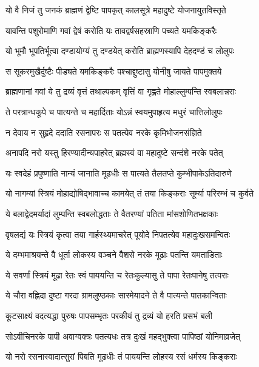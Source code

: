 \twolineshloka
{यो वै निजं तु जनकं ब्राह्मणं द्वेष्टि पापकृत्}
{कालसूत्रे महादुष्टे योजनायुतविस्तृते}%

\twolineshloka
{यावन्ति पशुरोमाणि गवां द्वेषं करोति यः}
{तावद्वर्षसहस्राणि पच्यते यमकिङ्करैः}%

\twolineshloka
{यो भूमौ भूपतिर्भूत्वा दण्डायोग्यं तु दण्डयेत्}
{करोति ब्राह्मणस्यापि देहदण्डं च लोलुपः}%

\twolineshloka
{स सूकरमुखैर्दुष्टैः पीड्यते यमकिङ्करैः}
{पश्चाद्दुष्टासु योनीषु जायते पापमुक्तये}%

\twolineshloka
{ब्राह्मणानां गवां ये तु द्रव्यं वृत्तं तथाल्पकम्}
{वृत्तिं वा गृह्णते मोहाल्लुम्पन्ति स्वबलान्नराः}%

\twolineshloka
{ते परत्रान्धकूपे च पात्यन्ते च महार्दिताः}
{योऽन्नं स्वयमुपाहृत्य मधुरं चात्तिलोलुपः}%

\twolineshloka
{न देवाय न सुहृदे ददाति रसनापरः}
{स पतत्येव नरके कृमिभोजनसंज्ञिते}%

\twolineshloka
{अनापदि नरो यस्तु हिरण्यादीन्यपाहरेत्}
{ब्रह्मस्वं वा महादुष्टे सन्दंशे नरके पतेत्}%

\twolineshloka
{यः स्वदेहं प्रपुष्णाति नान्यं जानाति मूढधीः}
{स पात्यते तैलतप्ते कुम्भीपाकेऽतिदारुणे}%

\twolineshloka
{यो नागम्यां स्त्रियं मोहाद्योषिद्भावाच्च कामयेत्}
{तं तया किङ्कराः सूर्म्या परिरम्भं च कुर्वते}%

\twolineshloka
{ये बलाद्वेदमर्यादां लुम्पन्ति स्वबलोद्धताः}
{ते वैतरण्यां पतिता मांसशोणितभक्षकाः}%

\twolineshloka
{वृषलद्यं यः स्त्रियं कृत्वा तया गार्हस्थ्यमाचरेत्}
{पूयोदे निपतत्येव महादुःखसमन्वितः}%

\twolineshloka
{ये दम्भमाश्रयन्ते वै धूर्ता लोकस्य वञ्चने}
{वैशसे नरके मूढाः पतन्ति यमताडिताः}%

\twolineshloka
{ये सवर्णां स्त्रियं मूढा रेतः स्वं पाययन्ति च}
{रेतःकुल्यासु ते पापा रेतःपानेषु तत्पराः}%

\twolineshloka
{ये चौरा वह्निदा दुष्टा गरदा ग्रामलुण्ठकाः}
{सारमेयादने ते वै पात्यन्ते पातकान्विताः}%

\twolineshloka
{कूटसाक्ष्यं वदत्यद्धा पुरुषः पापसम्भृतः}
{परकीयं तु द्रव्यं यो हरति प्रसभं बली}%

\twolineshloka
{सोऽवीचिनरके पापी अवाग्वक्त्रः पतत्यधः}
{तत्र दुःखं महद्भुक्त्वा पापिष्ठां योनिमाव्रजेत्}%

\twolineshloka
{यो नरो रसनास्वादात्सुरां पिबति मूढधीः}
{तं पाययन्ति लोहस्य रसं धर्मस्य किङ्कराः}%

